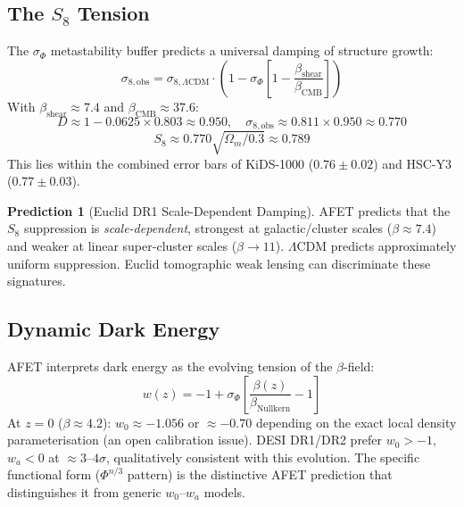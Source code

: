\documentclass[12pt,a4paper]{article}
\theoremstyle{definition}
\newtheorem{prediction}{Prediction}
\newcommand{\betaCMB}{\beta_{\mathrm{CMB}}}
\newcommand{\betanull}{\beta_{\mathrm{Nullkern}}}
\newcommand{\sigphi}{\sigma_{\Phi}}
\newcommand{\PhiAFET}{\Phi}      %
\begin{document}
\subsection{The $S_8$ Tension}

\begin{validated}
The $\sigphi$ metastability buffer predicts a universal damping of structure growth:
\begin{equation}
  \sigma_{8,\mathrm{obs}} = \sigma_{8,\Lambda\mathrm{CDM}}
    \cdot\left(1 - \sigphi\left[1 - \frac{\beta_{\mathrm{shear}}}{\betaCMB}\right]\right)
\end{equation}
With $\beta_{\mathrm{shear}} \approx 7.4$ and $\betaCMB \approx 37.6$:
\[
  D \approx 1 - 0.0625 \times 0.803 \approx 0.950,\quad
  \sigma_{8,\mathrm{obs}} \approx 0.811 \times 0.950 \approx 0.770
\]
\[
  S_8 \approx 0.770\sqrt{\Omega_m/0.3} \approx 0.789
\]
This lies within the combined error bars of KiDS-1000 ($0.76\pm0.02$)
and HSC-Y3 ($0.77\pm0.03$).
\end{validated}

\begin{prediction}[Euclid DR1 Scale-Dependent Damping]
AFET predicts that the $S_8$ suppression is \emph{scale-dependent}, strongest at
galactic/cluster scales ($\beta \approx 7.4$) and weaker at linear super-cluster
scales ($\beta \to 11$).
$\Lambda$CDM predicts approximately uniform suppression.
Euclid tomographic weak lensing can discriminate these signatures.
\end{prediction}

\subsection{Dynamic Dark Energy}

\begin{hypothesis}
AFET interprets dark energy as the evolving tension of the $\beta$-field:
\begin{equation}
  w(z) = -1 + \sigphi\left[\frac{\beta(z)}{\betanull} - 1\right]
\end{equation}
At $z=0$ ($\beta \approx 4.2$): $w_0 \approx -1.056$ or $\approx -0.70$ depending
on the exact local density parameterisation (an open calibration issue).
DESI DR1/DR2 prefer $w_0 > -1$, $w_a < 0$ at $\approx 3$--$4\sigma$,
qualitatively consistent with this evolution.
The specific functional form ($\PhiAFET^{n/3}$ pattern) is the distinctive AFET
prediction that distinguishes it from generic $w_0$--$w_a$ models.
\end{hypothesis}
\end{document}

